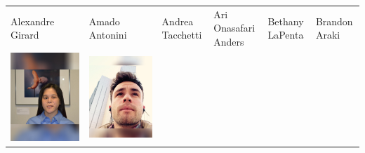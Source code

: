\documentclass[landscape,a0paper,fontscale=0.292]{baposter}
\begin{document}
\begin{poster}
{\begin{center}
\begin{tabularx}{\linewidth}{X X X X X X}
{\tiny \centering Alexandre Girard }& {\tiny \centering Amado Antonini }& {\tiny \centering Andrea Tacchetti }& {\tiny \centering Ari Onasafari Anders }& {\tiny \centering Bethany LaPenta }& {\tiny \centering Brandon Araki }\\ 
 {\centering \includegraphics[width=0.6\linewidth]{catliu.jpg}}&
{\centering \includegraphics[width=0.6\linewidth]{eharbitz.jpg}}&

\end{tabularx}
\end{center}}
\end{poster}
\end{document}
